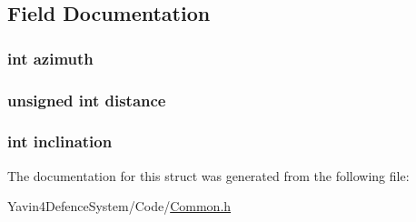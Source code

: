 \subsection{Field Documentation}
\hypertarget{structTrackingData_a866e78e12cb32dcaf1ded89bda8be8f5}{
\subsubsection[{azimuth}]{\setlength{\rightskip}{0pt plus 5cm}int azimuth}}\label{structTrackingData_a866e78e12cb32dcaf1ded89bda8be8f5}
\hypertarget{structTrackingData_a4bb47863775a37236bda65273c01b275}{
\subsubsection[{distance}]{\setlength{\rightskip}{0pt plus 5cm}unsigned int distance}}\label{structTrackingData_a4bb47863775a37236bda65273c01b275}
\hypertarget{structTrackingData_af308b9934394c8bcf7614eb1df2d863f}{
\subsubsection[{inclination}]{\setlength{\rightskip}{0pt plus 5cm}int inclination}}\label{structTrackingData_af308b9934394c8bcf7614eb1df2d863f}


The documentation for this struct was generated from the following file\+:\begin{DoxyCompactItemize}
\item 
Yavin4\+Defence\+System/\+Code/\hyperlink{Common_8h}{Common.\+h}\end{DoxyCompactItemize}
